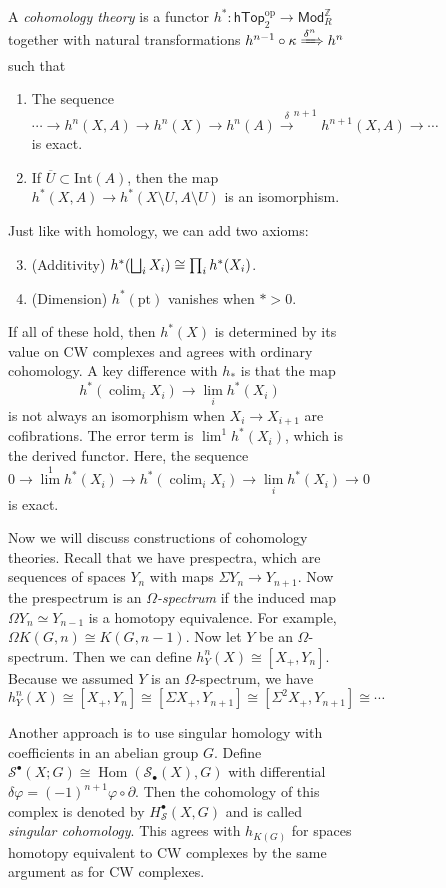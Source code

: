 \documentclass[leqno, openany]{memoir}
\theoremstyle{definition}
\theoremstyle{remark}
\theoremstyle{plain}
\theoremstyle{definition}
\theoremstyle{remark}
\newcommand{\Z}{\mathbb{Z}}
\newcommand{\mc}[1]{\mathcal{#1}}
\newcommand{\mr}[1]{\mathrm{#1}}
\newcommand{\ms}[1]{\mathsf{#1}}
\newcommand{\ol}[1]{\overline{#1}}
\DeclareMathOperator{\Hom}{Hom}
\begin{document}
\begin{figure}[H]
\begin{figure}[H]
A \textit{cohomology theory} is a functor $h^* \colon \ms{hTop}_2^{\mr{op}} \to
\ms{Mod}_R^{\Z}$ together with natural transformations $h^{n-1} \circ \kappa
\xRightarrow{\delta^n} h^n$ such that \begin{enumerate} \item The sequence \[
\cdots \to h^n(X,A) \to h^n(X) \to h^n(A) \xrightarrow{\delta}^{n+1}
h^{n+1}(X,A) \to \cdots \] is exact.  \item If $\ol{U} \subset \mr{Int}(A)$,
then the map $h^*(X,A) \to h^*(X \setminus U, A \setminus U)$ is an
isomorphism.  \end{enumerate} Just like with homology, we can add two axioms:
\begin{enumerate} \setcounter{enumi}{2} \item (Additivity) $h^*\qty(\bigsqcup_i
X_i) \cong \prod_i h^*(X_i)$.  \item (Dimension) $h^*(\mr{pt})$ vanishes when
$* > 0$.  \end{enumerate} If all of these hold, then $h^*(X)$ is determined by
its value on CW complexes and agrees with ordinary cohomology. A key difference
with $h_*$ is that the map \[ h^*(\operatorname{colim}_i X_i) \to \lim_i
h^*(X_i) \] is not always an isomorphism when $X_i \to X_{i+1}$ are
cofibrations. The error term is $\lim^1 h^*(X_i)$, which is the derived
functor. Here, the sequence \[ 0 \to \lim^1 h^*(X_i) \to
h^*(\operatorname{colim}_i X_i) \to \lim_i h^*(X_i) \to 0 \] is exact.

Now we will discuss constructions of cohomology theories. Recall that we have
prespectra, which are sequences of spaces $Y_n$ with maps $\Sigma Y_n \to
Y_{n+1}$. Now the prespectrum is an \textit{$\Omega$-spectrum} if the induced
map $\Omega Y_n \simeq Y_{n-1}$ is a homotopy equivalence. For example, $\Omega
K(G,n) \cong K(G, n-1)$. Now let $Y$ be an $\Omega$-spectrum. Then we can
define $h_Y^n(X) \cong [X_+, Y_n]$. Because we assumed $Y$ is an
$\Omega$-spectrum, we have \[ h_Y^n(X) \cong [X_+, Y_n] \cong [\Sigma X_+,
Y_{n+1}] \cong [\Sigma^2 X_+, Y_{n+1}] \cong \cdots \]

Another approach is to use singular homology with coefficients in an abelian
group $G$. Define $\mc{S}^{\bullet}(X; G) \cong \Hom(\mc{S}_{\bullet}(X), G)$
with differential $\delta \varphi = {(-1)}^{n+1} \varphi \circ \partial$. Then
the cohomology of this complex is denoted by $H_{\mc{S}}^{\bullet}(X,G)$ and is
called \textit{singular cohomology}. This agrees with $h_{K(G)}$ for spaces
homotopy equivalent to CW complexes by the same argument as for CW complexes.


\end{figure}
\end{figure}
\end{document}
